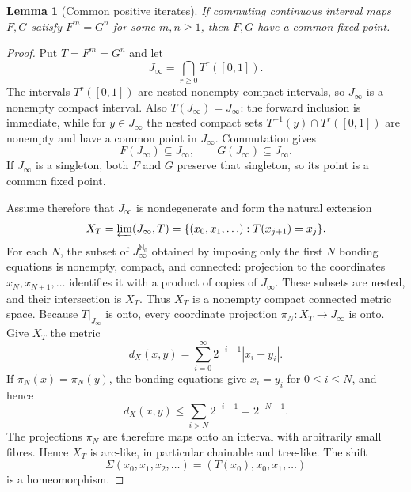 \documentclass[11pt]{article}
\newtheorem{lemma}[theorem]{Lemma}
\newcommand{\I}{[0,1]}
\begin{document}
\begin{lemma}[Common positive iterates]\label{lem:common-iterate}
If commuting continuous interval maps $F,G$ satisfy $F^m=G^n$ for some $m,n\ge1$, then $F,G$ have a
common fixed point.
\end{lemma}

\begin{proof}
Put $T=F^m=G^n$ and let
\[
J_\infty=\bigcap_{r\ge0}T^r(\I).
\]
The intervals $T^r(\I)$ are nested nonempty compact intervals, so $J_\infty$ is a nonempty compact
interval. Also $T(J_\infty)=J_\infty$: the forward inclusion is immediate, while for
$y\in J_\infty$ the nested compact sets $T^{-1}(y)\cap T^r(\I)$ are nonempty and have a common
point in $J_\infty$. Commutation gives
\[
F(J_\infty)\subseteq J_\infty,\qquad G(J_\infty)\subseteq J_\infty.
\]
If $J_\infty$ is a singleton, both $F$ and $G$ preserve that singleton, so its point is a common
fixed point.

Assume therefore that $J_\infty$ is nondegenerate and form the natural extension
\[
X_T=\varprojlim(J_\infty,T)
 =\{(x_0,x_1,\ldots):T(x_{j+1})=x_j\}.
\]
For each $N$, the subset of $J_\infty^{\mathbb N_0}$ obtained by imposing only the first $N$ bonding
equations is nonempty, compact, and connected: projection to the coordinates
$x_N,x_{N+1},\ldots$ identifies it with a product of copies of $J_\infty$. These subsets are nested,
and their intersection is $X_T$. Thus $X_T$ is a nonempty compact connected metric space. Because
$T|_{J_\infty}$ is onto, every coordinate projection $\pi_N:X_T\to J_\infty$ is onto. Give $X_T$
the metric
\[
d_X(x,y)=\sum_{i=0}^{\infty}2^{-i-1}|x_i-y_i|.
\]
If $\pi_N(x)=\pi_N(y)$, the bonding equations give $x_i=y_i$ for $0\leq i\leq N$, and hence
\[
d_X(x,y)\leq\sum_{i>N}2^{-i-1}=2^{-N-1}.
\]
The projections $\pi_N$ are therefore maps onto an interval with arbitrarily small fibres. Hence
$X_T$ is arc-like, in particular chainable and tree-like. The shift
\[
\Sigma(x_0,x_1,x_2,\ldots)=(T(x_0),x_0,x_1,\ldots)
\]
is a homeomorphism.


\end{proof}
\end{document}
